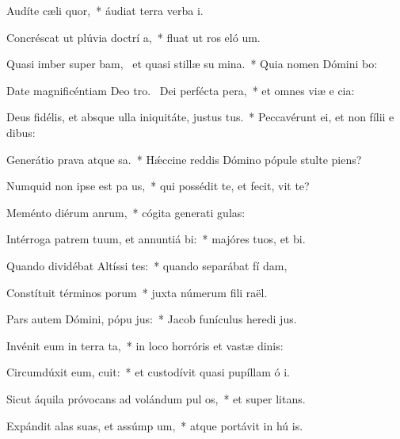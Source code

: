 \item Audíte cæli  quor,~* áudiat terra verba  i.
\item Concréscat ut plúvia doctrí a,~* fluat ut ros eló um.
\item Quasi imber super bam,~\pscross{} et quasi stillæ su mina.~* Quia nomen Dómini bo:
\item Date magnificéntiam Deo tro.~\pscross{} Dei perfécta  pera,~* et omnes viæ e cia:
\item Deus fidélis, et absque ulla iniquitáte, justus  tus.~* Peccavérunt ei, et non fílii e  dibus:
\item Generátio prava atque sa.~* Hǽccine reddis Dómino pópule stulte  piens?
\item Numquid non ipse est pa us,~* qui possédit te, et fecit,  vit te?
\item Meménto diérum anrum,~* cógita generati gulas:
\item Intérroga patrem tuum, et annuntiá bi:~* majóres tuos, et  bi.
\item Quando dividébat Altíssi tes:~* quando separábat fí dam,
\item Constítuit términos porum~* juxta númerum fili raël.
\item Pars autem Dómini, pópu jus:~* Jacob funículus heredi jus.
\item Invénit eum in terra ta,~* in loco horróris et vastæ dinis:
\item Circumdúxit eum,  cuit:~* et custodívit quasi pupíllam ó i.
\item Sicut áquila próvocans ad volándum pul os,~* et super  litans.
\item Expándit alas suas, et assúmp um,~* atque portávit in hú is.
